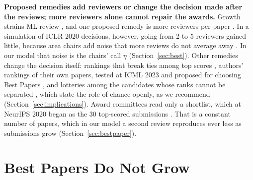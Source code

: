 \documentclass{article}
\begin{document}
\textbf{Proposed remedies add reviewers or change the decision made after the reviews; more reviewers alone cannot repair the awards.} Growth strains ML review \citep{shah2018design,kim2025position}, and one proposed remedy is more reviewers per paper \citep{kaplan2008sample,snell2015menage,forscher2019many}. In a simulation of ICLR 2020 decisions, however, going from 2 to 5 reviewers gained little, because area chairs add noise that more reviews do not average away \citep{tran2020open}. In our model that noise is the chairs' call $\eta$ (Section~\ref{sec:best}). Other remedies change the decision itself: rankings that break ties among top scores \citep{gallo2023score}, authors' rankings of their own papers, tested at ICML 2023 and proposed for choosing Best Papers \citep{su2026icml,wen2026recommending}, and lotteries among the candidates whose ranks cannot be separated \citep{fang2016lottery,heyard2022rethinking,goldberg2025principled}, which state the role of chance openly, as we recommend (Section~\ref{sec:implications}). Award committees read only a shortlist, which at NeurIPS 2020 began as the 30 top-scored submissions \citep{neurips2020awards}. That is a constant number of papers, which in our model a second review reproduces ever less as submissions grow (Section~\ref{sec:bestpaper}).

\section{Best Papers Do Not Grow}\label{app:bestpapers}
\end{document}
